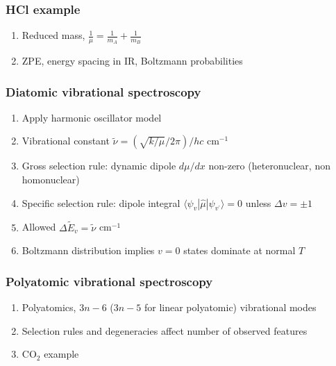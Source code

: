 \documentclass[11pt]{article}
\begin{document}
\subsubsection{HCl example}
\label{sec:orgb49c95b}
\begin{enumerate}
\item Reduced mass, \(\frac{1}{\mu}=\frac{1}{m_A}+\frac{1}{m_B}\)
\item ZPE, energy spacing in IR, Boltzmann probabilities
\end{enumerate}
\subsubsection{Diatomic vibrational spectroscopy}
\label{sec:org58ae800}
\begin{enumerate}
\item Apply harmonic oscillator model
\item Vibrational constant \(\tilde{\nu} = (\sqrt{k/\mu}/2\pi)/hc\) cm\(^{-1}\)
\item Gross selection rule: dynamic dipole \(d\mu/dx\) non-zero (heteronuclear, non homonuclear)
\item Specific selection rule: dipole integral \(\langle \psi_v|\hat\mu|\psi_{v^\prime} \rangle =0\)
unless \(\Delta v = \pm 1\)
\item Allowed \(\Delta \tilde{E}_v = \tilde{\nu}\) cm\(^{-1}\)
\item Boltzmann distribution implies \(v=0\) states dominate at normal \(T\)
\end{enumerate}
\subsubsection{Polyatomic vibrational spectroscopy}
\label{sec:orga97d3b0}
\begin{enumerate}
\item Polyatomics, \(3n-6\) (\(3n-5\) for linear polyatomic) vibrational modes
\item Selection rules and degeneracies affect number of observed features
\item CO\(_2\) example
\end{enumerate}
\end{document}
